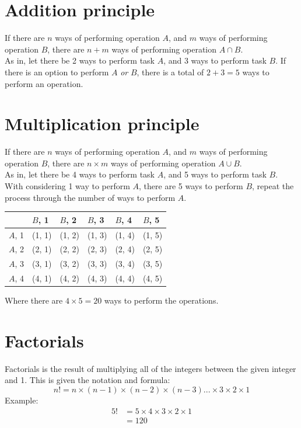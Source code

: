 \documentclass[a4paper,10pt]{report}
\begin{document}
\pagebreak

\section{Addition principle}
If there are $n$ ways of performing operation $A$, and $m$ ways of performing operation $B$, there are $n + m$ ways of performing operation $A \cap B$.\\

As in, let there be 2 ways to perform task $A$, and 3 ways to perform task $B$.  If there is an option to perform $A$ \emph{or} $B$, there is a total of $2 + 3 = 5$ ways to perform an operation.


\section{Multiplication principle}
If there are $n$ ways of performing operation $A$, and $m$ ways of performing operation $B$, there are $n \times m$ ways of performing operation $A \cup B$.\\

As in, let there be 4 ways to perform task $A$, and 5 ways to perform task $B$.  With considering 1 way to perform $A$, there are 5 ways to perform $B$, repeat the process through the number of ways to perform $A$.
\begin{center}
	\begin{tabular}{l|lllll}
		       & $B$, 1 & $B$, 2 & $B$, 3 & $B$, 4 & $B$, 5 \\ \hline
		$A$, 1 & (1, 1) & (1, 2) & (1, 3) & (1, 4) & (1, 5) \\
		$A$, 2 & (2, 1) & (2, 2) & (2, 3) & (2, 4) & (2, 5) \\
		$A$, 3 & (3, 1) & (3, 2) & (3, 3) & (3, 4) & (3, 5) \\
		$A$, 4 & (4, 1) & (4, 2) & (4, 3) & (4, 4) & (4, 5) \\
	\end{tabular}
\end{center}
Where there are $4 \times 5 = 20$ ways to perform the operations.


\section{Factorials}
Factorials is the result of multiplying all of the integers between the given integer and 1.  This is given the notation and formula:
$$
	n! = n \times (n-1) \times (n-2) \times (n-3)... \times 3 \times 2 \times 1
$$
Example:\\
\begin{align*}
	5! & = 5 \times 4 \times 3 \times 2 \times 1 \\
	   & = 120
\end{align*}
\end{document}
